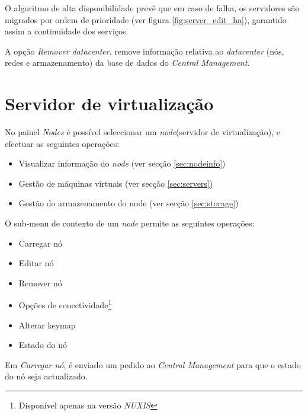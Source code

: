 O algoritmo de alta disponibilidade prevê que em caso de falha, os servidores são migrados por ordem de prioridade (ver figura \ref{fig:server_edit_ha}), garantido assim a continuidade dos serviços.

A opção \emph{Remover datacenter}, remove informação relativa ao \emph{datacenter} (nós, redes e armazenamento) da base de dados do \emph{Central Management}.


\section{Servidor de virtualização}
\label{sec:node}

No painel \emph{Nodes} é possível seleccionar um \emph{node}(servidor de virtualização), e efectuar as seguintes operações:
\begin{itemize}
    \item Visualizar informação do \emph{node} (ver secção \ref{sec:nodeinfo})
    \item Gestão de máquinas virtuais (ver secção \ref{sec:servers})
    \item Gestão do armazenamento do node (ver secção \ref{sec:storage})
\end{itemize}

O sub-menu de contexto de um \emph{node} permite as seguintes operações:
\begin{itemize}
    \item Carregar nó
    \item Editar nó
    \item Remover nó
    \item Opções de conectividade\footnote{Disponível apenas na versão \emph{NUXIS}}
    \item Alterar keymap
    \item Estado do nó
\end{itemize}

Em \emph{Carregar nó}, é enviado um pedido ao \emph{Central Management} para que o estado do nó seja actualizado. 

